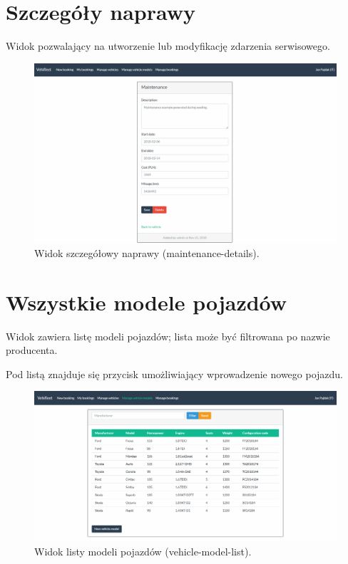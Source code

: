 \documentclass[eng,printmode,openany]{mgr}
\begin{document}
\begin{appendices}
		\section{Szczegóły naprawy}
		Widok pozwalający na utworzenie lub modyfikację zdarzenia serwisowego.
		\begin{figure}[H]
			\centering
			\includegraphics[scale=0.32]{images/views/maintenance-detail.png}
			\caption{Widok szczegółowy naprawy (maintenance-details).}
		\end{figure}
		
		\newpage	
		\section{Wszystkie modele pojazdów}	
		Widok zawiera listę modeli pojazdów; lista może być filtrowana po nazwie producenta.
		
		Pod listą znajduje się przycisk umożliwiający wprowadzenie nowego pojazdu.
		\begin{figure}[H]
			\centering
			\includegraphics[width=\textwidth]{images/views/vehicle-model-list.png}
			\caption{Widok listy modeli pojazdów (vehicle-model-list).}
		\end{figure}
		

\end{appendices}
\end{document}
